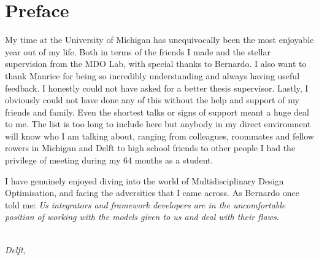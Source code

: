 \chapter*{Preface}

My time at the University of Michigan has unequivocally been the most enjoyable year out of my life. Both in terms of the friends I made and the stellar supervision from the MDO Lab, with special thanks to Bernardo. I also want to thank Maurice for being so incredibly understanding and always having useful feedback. I honestly could not have asked for a better thesis supervisor. Lastly, I obviously could not have done any of this without the help and support of my friends and family. Even the shortest talks or signs of support meant a huge deal to me. The list is too long to include here but anybody in my direct environment will know who I am talking about, ranging from colleagues, roommates and fellow rowers in Michigan and Delft to high school friends to other people I had the privilege of meeting during my 64 months as a student.

I have genuinely enjoyed diving into the world of Multidisciplinary Design Optimisation, and facing the adversities that I came across. As Bernardo once told me: \textit{Us integrators and framework developers are in the uncomfortable position of working with the models given to us and deal with their flaws.}

\begin{flushright}
{\makeatletter\itshape
    \ifdefvoid{\@author@short}{\@author}{\@author@short} \\
    Delft, \monthname{} \the\year{}
\makeatother}
\end{flushright}
